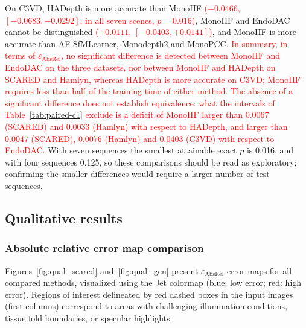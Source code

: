 \documentclass[a4paper,fleqn]{cas-dc}
\begin{document}
{On C3VD, HADepth is more accurate than MonoIIF \textcolor{red}{($-0.0466$, $[-0.0683, -0.0292]$, in all seven scenes, $p=0.016$)}, MonoIIF and EndoDAC cannot be distinguished \textcolor{red}{($-0.0111$, $[-0.0403, +0.0141]$)}, and MonoIIF is more accurate than AF-SfMLearner, Monodepth2 and MonoPCC.
\textcolor{red}{In summary, in terms of $\varepsilon_\textrm{AbsRel}$, no significant difference is detected between MonoIIF and EndoDAC on the three datasets, nor between MonoIIF and HADepth on SCARED and Hamlyn, whereas HADepth is more accurate on C3VD; MonoIIF requires less than half of the training time of either method. The absence of a significant difference does not establish equivalence: what the intervals of Table~\ref{tab:paired-c1} exclude is a deficit of MonoIIF larger than 0.0067 (SCARED) and 0.0033 (Hamlyn) with respect to HADepth, and larger than 0.0047 (SCARED), 0.0076 (Hamlyn) and 0.0403 (C3VD) with respect to EndoDAC.} With seven sequences the smallest attainable exact $p$ is 0.016, and with four sequences 0.125, so these comparisons should be read as exploratory; confirming the smaller differences would require a larger number of test sequences.
}
%
\subsection{Qualitative results}
\subsubsection{Absolute relative error map comparison}

Figures~\ref{fig:qual_scared} and~\ref{fig:qual_gen} present $\varepsilon_{\text{AbsRel}}$ error maps for 
all compared methods, visualized using the Jet colormap (blue: low error; red: high error). Regions of interest delineated by red dashed boxes in the input images (first columns) correspond to areas with challenging illumination conditions, tissue fold boundaries, or specular highlights.
\end{document}
